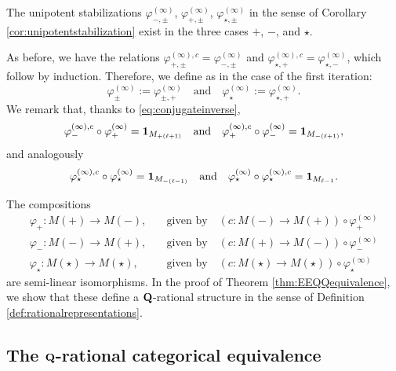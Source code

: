 \documentclass[a4paper,12pt,reqno]{amsart}
\newcommand{\QQ}{{\rm\bf Q}}
\theoremstyle{plain}
\theoremstyle{remark}
\begin{document}
    The unipotent stabilizations $\varphi_{-,\pm}^{(\infty)}$, $\varphi_{+,\pm}^{(\infty)}$, $\varphi_{\star,\pm}^{(\infty)}$ in the sense of Corollary \ref{cor:unipotentstabilization} exist in the three cases $+$, $-$, and $\star$.

    As before, we have the relations $\varphi_{+,\pm}^{(\infty),c}=\varphi_{-,\pm}^{(\infty)}$ and $\varphi_{\star,+}^{(\infty),c}=\varphi_{\star,-}^{(\infty)}$, which follow by induction. Therefore, we define as in the case of the first iteration:
    \[
    \varphi_\pm^{(\infty)}:=\varphi_{\pm,+}^{(\infty)}\quad\text{and}\quad\varphi_\star^{(\infty)}:=\varphi_{\star,+}^{(\infty)}.
    \]
    We remark that, thanks to \eqref{eq:conjugateinverse},
    \begin{equation}
      \varphi_{-}^{(\infty),c}\circ\varphi_+^{(\infty)}= {\bf1}_{M_{+(\ell+1)}} \quad\text{and}\quad \varphi_{+}^{(\infty),c}\circ\varphi_-^{(\infty)}= {\bf1}_{M_{-(\ell+1)}},
      \label{eq:conjugateinversepm}
    \end{equation}
    and analogously
    \begin{equation}
      \varphi_{\star}^{(\infty),c}\circ\varphi_\star^{(\infty)}=
      {\bf1}_{M_{-(\ell-1)}} \quad\text{and}\quad \varphi_{\star}^{(\infty)}\circ\varphi_\star^{(\infty),c}=
      {\bf1}_{M_{\ell-1}}.
      \label{eq:conjugateinversestar}
    \end{equation}

    The compositions
    \begin{align}
      \varphi_+\colon M(+)\to M(-),&\quad\text{given by}\quad (c\colon M(-)\to M(+))\circ\varphi_+^{(\infty)}\label{eq:varphiplus}\\
      \varphi_-\colon M(-)\to M(+),&\quad\text{given by}\quad (c\colon M(+)\to M(-))\circ\varphi_-^{(\infty)}\label{eq:varphiminus}\\
      \varphi_\star\colon M(\star)\to M(\star),&\quad\text{given by}\quad (c\colon M(\star)\to M(\star))\circ\varphi_\star^{(\infty)}\label{eq:varphistar}
    \end{align}
    are semi-linear isomorphisms. In the proof of Theorem \ref{thm:EEQQequivalence}, we show that these define a $\QQ$-rational structure in the sense of Definition \ref{def:rationalrepresentations}.

    \subsection{The $\QQ$-rational categorical equivalence}
\end{document}
